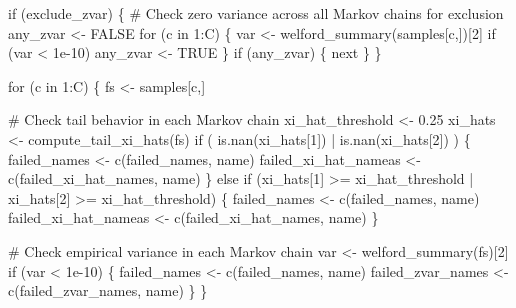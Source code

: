 \documentclass[
  letterpaper,
  DIV=11,
  numbers=noendperiod]{scrartcl}
\newenvironment{Shaded}{\begin{snugshade}}{\end{snugshade}}
\newcommand{\CommentTok}[1]{\textcolor[rgb]{0.37,0.37,0.37}{#1}}
\newcommand{\ConstantTok}[1]{\textcolor[rgb]{0.56,0.35,0.01}{#1}}
\newcommand{\ControlFlowTok}[1]{\textcolor[rgb]{0.00,0.23,0.31}{#1}}
\newcommand{\DecValTok}[1]{\textcolor[rgb]{0.68,0.00,0.00}{#1}}
\newcommand{\FloatTok}[1]{\textcolor[rgb]{0.68,0.00,0.00}{#1}}
\newcommand{\FunctionTok}[1]{\textcolor[rgb]{0.28,0.35,0.67}{#1}}
\newcommand{\NormalTok}[1]{\textcolor[rgb]{0.00,0.23,0.31}{#1}}
\newcommand{\OtherTok}[1]{\textcolor[rgb]{0.00,0.23,0.31}{#1}}
\newcommand{\SpecialCharTok}[1]{\textcolor[rgb]{0.37,0.37,0.37}{#1}}
\begin{document}
\begin{Shaded}
\begin{Highlighting}[]
    \ControlFlowTok{if}\NormalTok{ (exclude\_zvar) \{}
      \CommentTok{\# Check zero variance across all Markov chains for exclusion}
\NormalTok{      any\_zvar }\OtherTok{\textless{}{-}} \ConstantTok{FALSE}
      \ControlFlowTok{for}\NormalTok{ (c }\ControlFlowTok{in} \DecValTok{1}\SpecialCharTok{:}\NormalTok{C) \{}
\NormalTok{        var }\OtherTok{\textless{}{-}} \FunctionTok{welford\_summary}\NormalTok{(samples[c,])[}\DecValTok{2}\NormalTok{]}
        \ControlFlowTok{if}\NormalTok{ (var }\SpecialCharTok{\textless{}} \FloatTok{1e{-}10}\NormalTok{)}
\NormalTok{          any\_zvar }\OtherTok{\textless{}{-}} \ConstantTok{TRUE}
\NormalTok{      \}}
      \ControlFlowTok{if}\NormalTok{ (any\_zvar) \{}
        \ControlFlowTok{next}
\NormalTok{      \}}
\NormalTok{    \}}

    \ControlFlowTok{for}\NormalTok{ (c }\ControlFlowTok{in} \DecValTok{1}\SpecialCharTok{:}\NormalTok{C) \{}
\NormalTok{      fs }\OtherTok{\textless{}{-}}\NormalTok{ samples[c,]}
      
      \CommentTok{\# Check tail behavior in each Markov chain}
\NormalTok{      xi\_hat\_threshold }\OtherTok{\textless{}{-}} \FloatTok{0.25}
\NormalTok{      xi\_hats }\OtherTok{\textless{}{-}} \FunctionTok{compute\_tail\_xi\_hats}\NormalTok{(fs)}
      \ControlFlowTok{if}\NormalTok{ ( }\FunctionTok{is.nan}\NormalTok{(xi\_hats[}\DecValTok{1}\NormalTok{]) }\SpecialCharTok{|} \FunctionTok{is.nan}\NormalTok{(xi\_hats[}\DecValTok{2}\NormalTok{]) ) \{}
\NormalTok{        failed\_names }\OtherTok{\textless{}{-}} \FunctionTok{c}\NormalTok{(failed\_names, name)}
\NormalTok{        failed\_xi\_hat\_nameas }\OtherTok{\textless{}{-}} \FunctionTok{c}\NormalTok{(failed\_xi\_hat\_names, name)}
\NormalTok{      \} }\ControlFlowTok{else} \ControlFlowTok{if}\NormalTok{ (xi\_hats[}\DecValTok{1}\NormalTok{] }\SpecialCharTok{\textgreater{}=}\NormalTok{ xi\_hat\_threshold }\SpecialCharTok{|} 
\NormalTok{          xi\_hats[}\DecValTok{2}\NormalTok{] }\SpecialCharTok{\textgreater{}=}\NormalTok{ xi\_hat\_threshold) \{}
\NormalTok{        failed\_names }\OtherTok{\textless{}{-}} \FunctionTok{c}\NormalTok{(failed\_names, name)}
\NormalTok{        failed\_xi\_hat\_nameas }\OtherTok{\textless{}{-}} \FunctionTok{c}\NormalTok{(failed\_xi\_hat\_names, name)}
\NormalTok{      \}}
      
      \CommentTok{\# Check empirical variance in each Markov chain}
\NormalTok{      var }\OtherTok{\textless{}{-}} \FunctionTok{welford\_summary}\NormalTok{(fs)[}\DecValTok{2}\NormalTok{]}
      \ControlFlowTok{if}\NormalTok{ (var }\SpecialCharTok{\textless{}} \FloatTok{1e{-}10}\NormalTok{) \{}
\NormalTok{        failed\_names }\OtherTok{\textless{}{-}} \FunctionTok{c}\NormalTok{(failed\_names, name)}
\NormalTok{        failed\_zvar\_names }\OtherTok{\textless{}{-}} \FunctionTok{c}\NormalTok{(failed\_zvar\_names, name) }
\NormalTok{      \}}
\NormalTok{    \}}


\end{Highlighting}
\end{Shaded}
\end{document}

